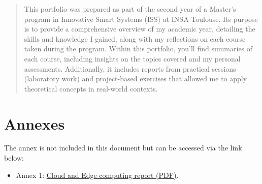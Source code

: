 \documentclass[a4paper, 14.49998pt]{report}
\begin{document}
\begin{abstract}

    This portfolio was prepared as part of the second year of a Master’s program in Innovative Smart Systems (ISS) at INSA Toulouse.
    Its purpose is to provide a comprehensive overview of my academic year, detailing the skills and knowledge I gained, along with my reflections on each course taken during the program.
    Within this portfolio, you’ll find summaries of each course, including insights on the topics covered and my personal assessments. 
    Additionally, it includes reports from practical sessions (laboratory work) and project-based exercises that allowed me to apply theoretical concepts in real-world contexts.

\end{abstract}


\renewcommand\contentsname{Table of contents}
\tableofcontents
\newpage







\newpage
\section{Annexes}
The annex is not included in this document but can be accessed via the link below:
\begin{itemize}
    \item Annex 1: \href{annexe/BIENDOU-BRUNETTO-VASSEUR-Cloud_Computing_Report.pdf}{Cloud and Edge computing report  (PDF)}.
\end{itemize}
\end{document}
